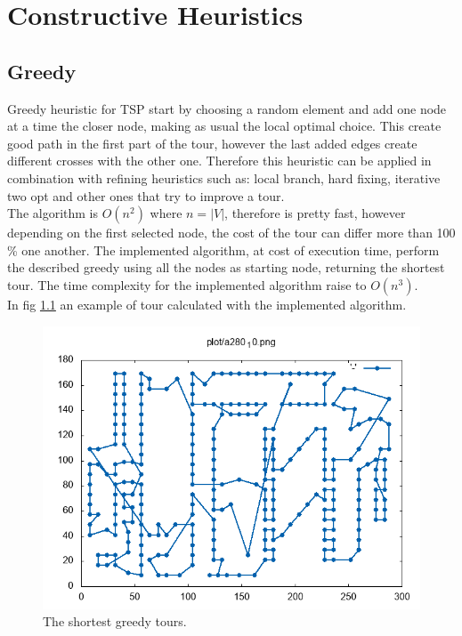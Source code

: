 \chapter{Constructive Heuristics}

\section{Greedy}\label{sec:greedy}
Greedy heuristic for TSP start by choosing a random element and add one node at a time the closer node, making as usual the local optimal choice. This create good path in the first part of the tour, however the last added edges create different crosses with the other one. Therefore this heuristic can be applied in combination with refining heuristics such as: local branch, hard fixing, iterative two opt and other ones that try to improve a tour.\\
The algorithm is $ O(n^2) $ where $ n = |V| $, therefore is pretty fast, however depending on the first selected node, the cost of the tour can differ more than 100 \% one another. The implemented algorithm, at cost of execution time, perform the described greedy using all the nodes as starting node, returning the shortest tour. The time complexity for the implemented algorithm raise to $ O(n^3) $.\\
In fig \ref{fig:a280_10_} an example of tour calculated with the implemented algorithm.

\begin{figure}[h]
	\centering
	\centering
	\includegraphics[width=0.7\columnwidth]{../res/a280_10.png}
	\caption{The shortest greedy tours.}
	\label{fig:a280_10_}
\end{figure}



